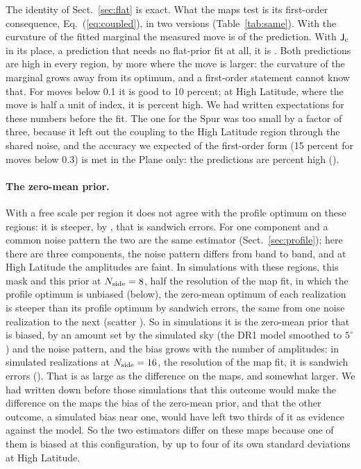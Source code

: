 The identity of Sect.~\ref{sec:flat} is exact. What the maps test is its first-order consequence,
Eq.~(\ref{eq:coupled}), in two versions (Table~\ref{tab:same}). With the curvature of the fitted
marginal the measured move is  of the prediction. With $\mathsf{J}_{\rm c}$ in its place, a
prediction that needs no flat-prior fit at all, it is . Both predictions are high in
every region, by more where the move is larger: the curvature of the marginal grows away from its
optimum, and a first-order statement cannot know that. For moves below 0.1 it is good to 10
percent; at High Latitude, where the move is half a unit of index, it is  percent
high. We had written expectations for these numbers before the fit. The one for the Spur was too
small by a factor of three, because it left out the coupling to the High Latitude region through the
shared noise, and the accuracy we expected of the first-order form (15 percent for moves below 0.3)
is met in the Plane only: the predictions are  percent high ().

\paragraph{The zero-mean prior.} With a free scale per region it does not agree with the profile
optimum on these regions: it is steeper, by , that is  sandwich
errors. For one component and a common noise pattern the two are the same estimator
(Sect.~\ref{sec:profile}); here there are three components, the noise pattern differs from band to
band, and at High Latitude the amplitudes are faint. In  simulations with these regions,
this mask and this prior at $N_{\rm side}=8$, half the resolution of the map fit, in which the profile
optimum is unbiased (below), the zero-mean optimum of each realization is steeper than its profile
optimum by  sandwich errors, the same from one noise realization to the next
(scatter ). So in simulations it is the zero-mean prior that is biased,
by an amount set by the simulated sky (the DR1 model smoothed to $5^\circ$) and the noise pattern,
and the bias grows with the number of amplitudes: in  simulated realizations at
$N_{\rm side}=16$, the resolution of the map fit, it is  sandwich errors
(). That is as large as the difference on the maps, and somewhat larger. We had written
down before those simulations that this outcome would make the difference on the maps the bias of
the zero-mean prior, and that the other outcome, a simulated bias near one, would have left two
thirds of it as evidence against the model. So the two estimators differ on these maps because one
of them is biased at this configuration, by up to four of its own standard deviations at High
Latitude.

